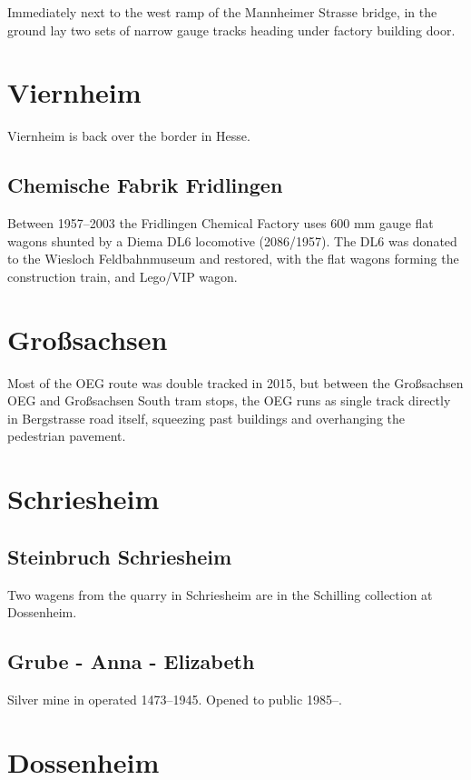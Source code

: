 \documentclass[a4paper]{report}
\begin{document}
Immediately next to the west ramp of the Mannheimer Strasse bridge, in
the ground lay two sets of narrow gauge tracks heading under
factory building door.

\section{Viernheim}

Viernheim is back over the border in Hesse.

\subsection{Chemische Fabrik Fridlingen}

Between 1957--2003 the Fridlingen Chemical Factory uses 600 mm gauge
flat wagons shunted by a Diema DL6 locomotive (2086/1957).  The DL6
was donated to the Wiesloch Feldbahnmuseum and restored, with the flat
wagons forming the construction train, and Lego/VIP wagon.

\section{Großsachsen}

Most of the OEG route was double tracked in 2015, but between the
Großsachsen OEG and Großsachsen South tram stops, the OEG runs as
single track directly in Bergstrasse road itself, squeezing past
buildings and overhanging the pedestrian pavement.

\section{Schriesheim}

\subsection{Steinbruch Schriesheim}

Two wagens from the quarry in Schriesheim are in the Schilling collection at Dossenheim.\cite{Katzenberger-Ruf-2015}

\subsection{Grube - Anna - Elizabeth}

Silver mine in operated 1473--1945.  Opened to public 1985--.\cite[``Geschichte'']{Anna-Elizabeth}

\section{Dossenheim}
\end{document}
